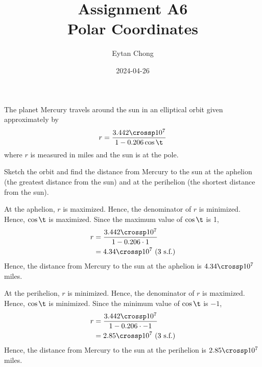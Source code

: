 \documentclass{echw}
\title{Assignment A6\\Polar Coordinates}
\author{Eytan Chong}
\date{2024-04-26}
\begin{document}
    \problem{}
        The planet Mercury travels around the sun in an elliptical orbit given approximately by
        \[
            r = \dfrac{3.442 \crossp 10^7}{1 - 0.206\cos\t}
        \]
         where $r$ is measured in miles and the sun is at the pole.

        Sketch the orbit and find the distance from Mercury to the sun at the aphelion (the greatest distance from the sun) and at the perihelion (the shortest distance from the sun).

    \solution
        \begin{center}
        \end{center}

        At the aphelion, $r$ is maximized. Hence, the denominator of $r$ is minimized. Hence, $\cos \t$ is maximized. Since the maximum value of $\cos \t$ is 1,
        \begin{align*}
            r &= \dfrac{3.442 \crossp 10^7}{1 - 0.206\cdot1}\\
            &= 4.34 \crossp 10^7 \tosf{3}
        \end{align*}
        Hence, the distance from Mercury to the sun at the aphelion is $4.34 \crossp 10^7$ miles.


        At the perihelion, $r$ is minimized. Hence, the denominator of $r$ is maximized. Hence, $\cos \t$ is minimized. Since the minimum value of $\cos \t$ is $-1$,
        \begin{align*}
            r &= \dfrac{3.442 \crossp 10^7}{1 - 0.206\cdot-1}\\
            &= 2.85 \crossp 10^7 \tosf{3}
        \end{align*}
        Hence, the distance from Mercury to the sun at the perihelion is $2.85 \crossp 10^7$ miles.
\end{document}
